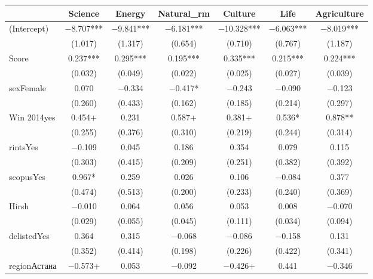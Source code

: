 \begin{table}
\centering
\begin{tabular}[t]{lcccccc}
\toprule
  & Science & Energy & Natural\_rm & Culture & Life & Agriculture\\
\midrule
(Intercept) & \num{-8.707}*** & \num{-9.841}*** & \num{-6.181}*** & \num{-10.328}*** & \num{-6.063}*** & \num{-8.019}***\\
 & (\num{1.017}) & (\num{1.317}) & (\num{0.654}) & (\num{0.710}) & (\num{0.767}) & (\num{1.187})\\
Score & \num{0.237}*** & \num{0.295}*** & \num{0.195}*** & \num{0.335}*** & \num{0.215}*** & \num{0.224}***\\
 & (\num{0.032}) & (\num{0.049}) & (\num{0.022}) & (\num{0.025}) & (\num{0.027}) & (\num{0.039})\\
sexFemale & \num{0.070} & \num{-0.334} & \num{-0.417}* & \num{-0.243} & \num{-0.090} & \num{-0.123}\\
 & (\num{0.260}) & (\num{0.433}) & (\num{0.162}) & (\num{0.185}) & (\num{0.214}) & (\num{0.297})\\
Win 2014yes & \num{0.454}+ & \num{0.231} & \num{0.587}+ & \num{0.381}+ & \num{0.536}* & \num{0.878}**\\
 & (\num{0.255}) & (\num{0.376}) & (\num{0.310}) & (\num{0.219}) & (\num{0.244}) & (\num{0.314})\\
rintsYes & \num{-0.109} & \num{0.045} & \num{0.186} & \num{0.354} & \num{0.079} & \num{0.115}\\
 & (\num{0.303}) & (\num{0.415}) & (\num{0.209}) & (\num{0.251}) & (\num{0.382}) & (\num{0.392})\\
scopusYes & \num{0.967}* & \num{0.259} & \num{0.026} & \num{0.106} & \num{-0.084} & \num{0.377}\\
 & (\num{0.474}) & (\num{0.513}) & (\num{0.200}) & (\num{0.233}) & (\num{0.240}) & (\num{0.369})\\
Hirsh & \num{-0.010} & \num{0.064} & \num{0.056} & \num{0.053} & \num{0.008} & \num{-0.070}\\
 & (\num{0.029}) & (\num{0.055}) & (\num{0.045}) & (\num{0.111}) & (\num{0.034}) & (\num{0.094})\\
delistedYes & \num{0.364} & \num{0.315} & \num{-0.068} & \num{-0.086} & \num{-0.158} & \num{0.131}\\
 & (\num{0.352}) & (\num{0.414}) & (\num{0.198}) & (\num{0.226}) & (\num{0.422}) & (\num{0.341})\\
regionАстана & \num{-0.573}+ & \num{0.053} & \num{-0.092} & \num{-0.426}+ & \num{0.441} & \num{-0.346}\\

\end{tabular}
\end{table}
